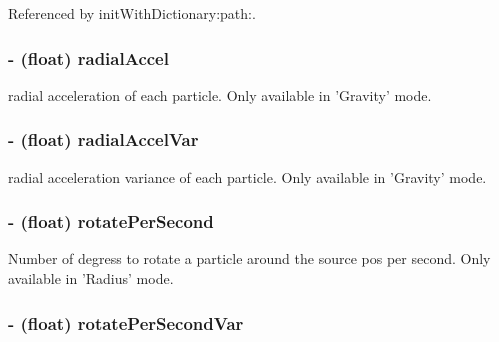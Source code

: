 Referenced by init\-With\-Dictionary\-:path\-:.

\hypertarget{interface_c_c_particle_system_a7783624c120b134876370ea938bc0bda}{
\subsubsection[{radial\-Accel}]{\setlength{\rightskip}{0pt plus 5cm}-\/ (float) {\bf radial\-Accel}}}\label{interface_c_c_particle_system_a7783624c120b134876370ea938bc0bda}
radial acceleration of each particle. Only available in 'Gravity' mode. \hypertarget{interface_c_c_particle_system_a6131e43941470fe74649ed573ff65235}{
\subsubsection[{radial\-Accel\-Var}]{\setlength{\rightskip}{0pt plus 5cm}-\/ (float) {\bf radial\-Accel\-Var}}}\label{interface_c_c_particle_system_a6131e43941470fe74649ed573ff65235}
radial acceleration variance of each particle. Only available in 'Gravity' mode. \hypertarget{interface_c_c_particle_system_ab80b9909c7e9b81d37c81f1db8c2a9ae}{
\subsubsection[{rotate\-Per\-Second}]{\setlength{\rightskip}{0pt plus 5cm}-\/ (float) {\bf rotate\-Per\-Second}}}\label{interface_c_c_particle_system_ab80b9909c7e9b81d37c81f1db8c2a9ae}
Number of degress to rotate a particle around the source pos per second. Only available in 'Radius' mode. \hypertarget{interface_c_c_particle_system_a13444d6216268c4e75e68f35800a2fa4}{
\subsubsection[{rotate\-Per\-Second\-Var}]{\setlength{\rightskip}{0pt plus 5cm}-\/ (float) {\bf rotate\-Per\-Second\-Var}}}\label{interface_c_c_particle_system_a13444d6216268c4e75e68f35800a2fa4}
